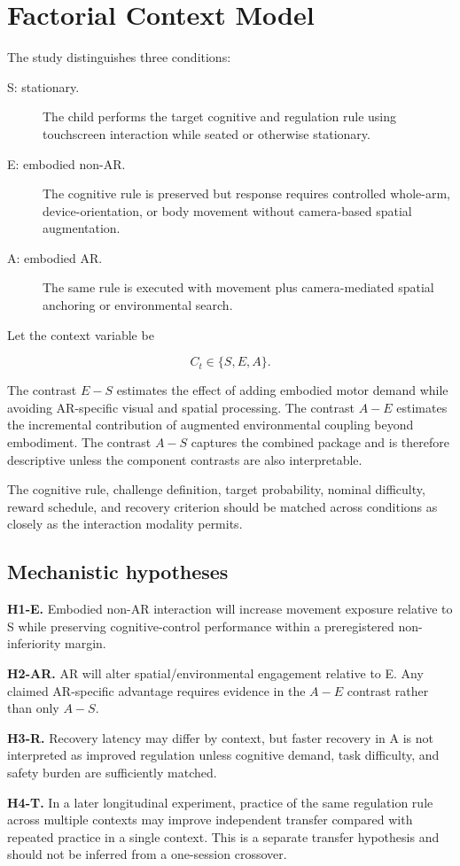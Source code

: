 \section{Factorial Context Model}

The study distinguishes three conditions:

\begin{description}
\item[S: stationary.] The child performs the target cognitive and regulation rule using touchscreen interaction while seated or otherwise stationary.
\item[E: embodied non-AR.] The cognitive rule is preserved but response requires controlled whole-arm, device-orientation, or body movement without camera-based spatial augmentation.
\item[A: embodied AR.] The same rule is executed with movement plus camera-mediated spatial anchoring or environmental search.
\end{description}

Let the context variable be

\[
C_t \in \{S,E,A\}.
\]

The contrast \(E-S\) estimates the effect of adding embodied motor demand while avoiding AR-specific visual and spatial processing. The contrast \(A-E\) estimates the incremental contribution of augmented environmental coupling beyond embodiment. The contrast \(A-S\) captures the combined package and is therefore descriptive unless the component contrasts are also interpretable.

The cognitive rule, challenge definition, target probability, nominal difficulty, reward schedule, and recovery criterion should be matched across conditions as closely as the interaction modality permits.

\subsection{Mechanistic hypotheses}

\textbf{H1-E.} Embodied non-AR interaction will increase movement exposure relative to S while preserving cognitive-control performance within a preregistered non-inferiority margin.

\textbf{H2-AR.} AR will alter spatial/environmental engagement relative to E. Any claimed AR-specific advantage requires evidence in the \(A-E\) contrast rather than only \(A-S\).

\textbf{H3-R.} Recovery latency may differ by context, but faster recovery in A is not interpreted as improved regulation unless cognitive demand, task difficulty, and safety burden are sufficiently matched.

\textbf{H4-T.} In a later longitudinal experiment, practice of the same regulation rule across multiple contexts may improve independent transfer compared with repeated practice in a single context. This is a separate transfer hypothesis and should not be inferred from a one-session crossover.

